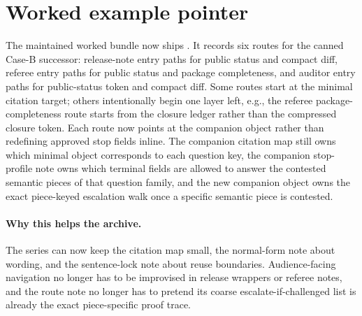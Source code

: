 \documentclass[11pt]{article}
\begin{document}
\section{Worked example pointer}
The maintained worked bundle now ships .\cite{series:workedexample}
It records six routes for the canned Case-B successor: release-note entry paths for public status and compact diff, referee entry paths for public status and package completeness, and auditor entry paths for public-status token and compact diff.
Some routes start at the minimal citation target; others intentionally begin one layer left, e.g., the referee package-completeness route starts from the closure ledger rather than the compressed closure token.
Each route now points at the companion  object rather than redefining approved stop fields inline. The companion citation map still owns which minimal object corresponds to each question key, the companion stop-profile note owns which terminal fields are allowed to answer the contested semantic pieces of that question family, and the new companion  object owns the exact piece-keyed escalation walk once a specific semantic piece is contested.\cite{series:downstreamnormalforms,series:challengestops,series:challengebranches}

\paragraph{Why this helps the archive.}
The series can now keep the citation map small, the normal-form note about wording, and the sentence-lock note about reuse boundaries.
Audience-facing navigation no longer has to be improvised in release wrappers or referee notes, and the route note no longer has to pretend its coarse escalate-if-challenged list is already the exact piece-specific proof trace.
\end{document}
